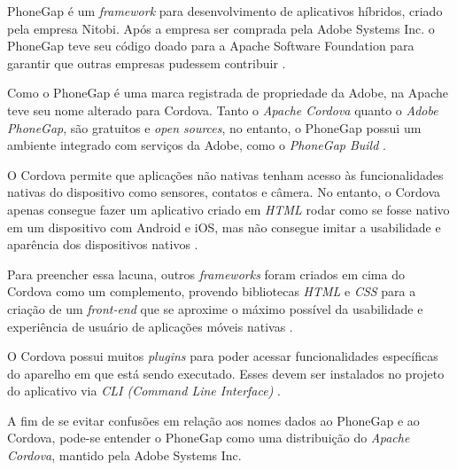 PhoneGap é um \textit{framework} para desenvolvimento de aplicativos híbridos, criado pela empresa Nitobi. 
Após a empresa ser comprada pela Adobe Systems Inc. o PhoneGap teve seu código doado para a Apache Software Foundation 
para garantir que outras empresas pudessem contribuir \cite{bezerra_desenvolvimento_2016}.%


Como o PhoneGap é uma marca registrada de propriedade da Adobe, na Apache teve seu nome alterado para Cordova.
Tanto o \textit{Apache Cordova} quanto o \textit{Adobe PhoneGap}, são gratuitos e \textit{open sources}, no entanto, o 
PhoneGap possui um ambiente integrado com serviços da Adobe, como o \textit{PhoneGap Build} \cite{bezerra_desenvolvimento_2016}.

O Cordova permite que aplicações não nativas tenham acesso às funcionalidades nativas do dispositivo como sensores, 
contatos e câmera. No entanto, o Cordova apenas consegue fazer um aplicativo criado em 
\textit{HTML} rodar como se fosse nativo em um dispositivo com Android e iOS, mas não consegue 
imitar a usabilidade e aparência dos dispositivos nativos \cite{bezerra_desenvolvimento_2016}. 

Para preencher essa lacuna, outros \textit{frameworks} foram criados em cima do Cordova como um complemento, 
provendo bibliotecas \textit{HTML} e \textit{CSS} para a 
criação de um \textit{front-end} que se aproxime o máximo possível da usabilidade e experiência de usuário de 
aplicações móveis nativas \cite{bezerra_desenvolvimento_2016}.

O Cordova possui muitos \textit{plugins} para poder acessar funcionalidades específicas do aparelho em que está sendo 
executado. Esses devem ser instalados no projeto do aplicativo via \textit{CLI (Command Line Interface)} \cite{bezerra_desenvolvimento_2016}. 

A fim de se evitar confusões em relação aos nomes dados ao PhoneGap e ao Cordova, pode-se entender o PhoneGap 
como uma distribuição do \textit{Apache Cordova}, mantido pela Adobe Systems Inc. 



